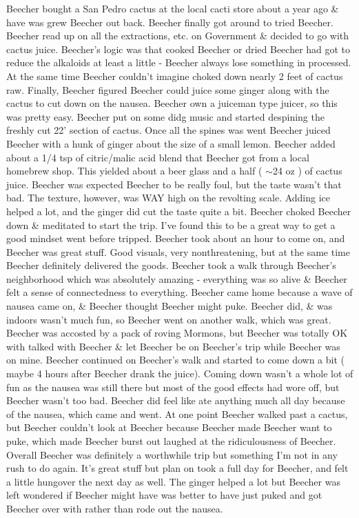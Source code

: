 \documentclass[12pt]{book}
\begin{document}
Beecher bought a San Pedro cactus at the local cacti store about a year ago \& have was grew Beecher out back. Beecher finally got around to tried Beecher. Beecher read up on all the extractions, etc. on Government \& decided to go with cactus juice. Beecher's logic was that cooked Beecher or dried Beecher had got to reduce the alkaloids at least a little - Beecher always lose something in processed. At the same time Beecher couldn't imagine choked down nearly 2 feet of cactus raw. Finally, Beecher figured Beecher could juice some ginger along with the cactus to cut down on the nausea. Beecher own a juiceman type juicer, so this was pretty easy. Beecher put on some didg music and started despining the freshly cut 22' section of cactus. Once all the spines was went Beecher juiced Beecher with a hunk of ginger about the size of a small lemon. Beecher added about a 1/4 tsp of citric/malic acid blend that Beecher got from a local homebrew shop. This yielded about a beer glass and a half ( $\sim$24 oz ) of cactus juice. Beecher was expected Beecher to be really foul, but the taste wasn't that bad. The texture, however, was WAY high on the revolting scale. Adding ice helped a lot, and the ginger did cut the taste quite a bit. Beecher choked Beecher down \& meditated to start the trip. I've found this to be a great way to get a good mindset went before tripped. Beecher took about an hour to come on, and Beecher was great stuff. Good visuals, very nonthreatening, but at the same time Beecher definitely delivered the goods. Beecher took a walk through Beecher's neighborhood which was absolutely amazing - everything was so alive \& Beecher felt a sense of connectedness to everything. Beecher came home because a wave of nausea came on, \& Beecher thought Beecher might puke. Beecher did, \& was indoors wasn't much fun, so Beecher went on another walk, which was great. Beecher was accosted by a pack of roving Mormons, but Beecher was totally OK with talked with Beecher \& let Beecher be on Beecher's trip while Beecher was on mine. Beecher continued on Beecher's walk and started to come down a bit ( maybe 4 hours after Beecher drank the juice). Coming down wasn't a whole lot of fun as the nausea was still there but most of the good effects had wore off, but Beecher wasn't too bad. Beecher did feel like ate anything much all day because of the nausea, which came and went. At one point Beecher walked past a cactus, but Beecher couldn't look at Beecher because Beecher made Beecher want to puke, which made Beecher burst out laughed at the ridiculousness of Beecher. Overall Beecher was definitely a worthwhile trip but something I'm not in any rush to do again. It's great stuff but plan on took a full day for Beecher, and felt a little hungover the next day as well. The ginger helped a lot but Beecher was left wondered if Beecher might have was better to have just puked and got Beecher over with rather than rode out the nausea.
\end{document}

